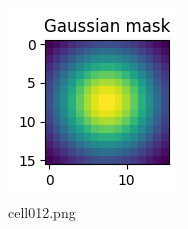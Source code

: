 \begin{figure}[ht]
	\centering
	\includegraphics[scale=0.8, max width=\linewidth]{./fig/energy-based-model/predictive-coding/cell012.png}
	\caption{cell012.png}
	\label{cell012.png}
\end{figure}